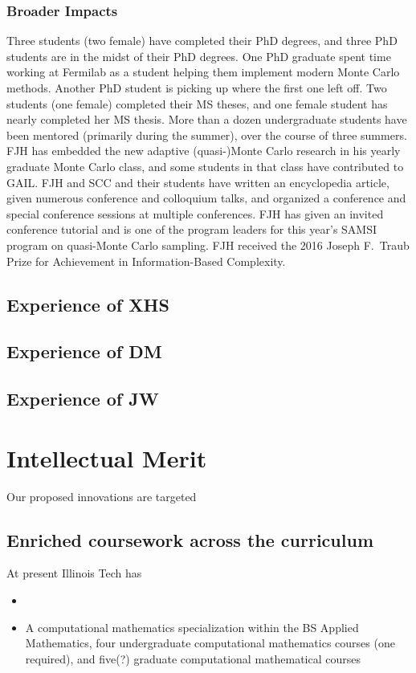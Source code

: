 \documentclass[11pt]{NSFamsart}
\begin{document}
\subsubsection{Broader Impacts}  Three students (two female) have completed their PhD degrees, and three PhD students are in the midst of their PhD degrees.  One PhD graduate spent time working at Fermilab as a student helping them implement modern Monte Carlo methods.  Another PhD student is picking up where the first one left off.  Two students (one female) completed their MS theses, and one female student has nearly completed her MS thesis. More than a dozen undergraduate students have been mentored (primarily during the summer),  over the course of three summers.  FJH has embedded the new adaptive (quasi-)Monte Carlo research in his yearly graduate Monte Carlo class, and some students in that class have contributed to GAIL.  FJH and SCC and their students have written an encyclopedia article, given numerous conference and colloquium talks, and organized a conference and special conference sessions at multiple conferences.  FJH has given an invited conference tutorial and is one of the program leaders for this year's SAMSI program on quasi-Monte Carlo sampling.  FJH received the 2016 Joseph F.\ Traub Prize for Achievement in Information-Based Complexity.






\subsection{Experience of XHS}

\subsection{Experience of DM}

\subsection{Experience of JW}



\section{Intellectual Merit}
Our proposed innovations are targeted 

\subsection{Enriched coursework across the curriculum} At present Illinois Tech has   
\begin{itemize} 

\item {}

\item A computational mathematics specialization within the BS Applied Mathematics, four undergraduate computational mathematics courses (one required), and five(?) graduate computational mathematical courses

\end{itemize}
\end{document}
